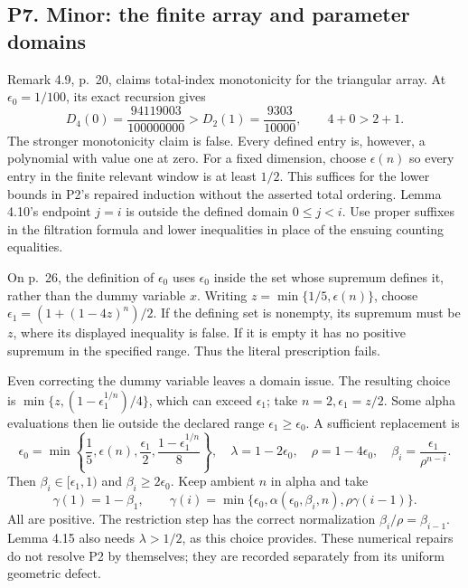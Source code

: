 \documentclass[10pt]{article}
\begin{document}
\subsection*{P7. Minor: the finite array and parameter domains}
Remark 4.9, p. 20, claims total-index monotonicity for the triangular array. At \(\epsilon_0=1/100\), its exact recursion gives \[D_4(0)=\frac{94119003}{100000000}
       >D_2(1)=\frac{9303}{10000},
 \qquad 4+0>2+1.\] The stronger monotonicity claim is false. Every defined entry is, however, a polynomial with value one at zero. For a fixed dimension, choose \(\epsilon(n)\) so every entry in the finite relevant window is at least \(1/2\). This suffices for the lower bounds in P2’s repaired induction without the asserted total ordering. Lemma 4.10’s endpoint \(j=i\) is outside the defined domain \(0\le j<i\). Use proper suffixes in the filtration formula and lower inequalities in place of the ensuing counting equalities.\par
On p. 26, the definition of \(\epsilon_0\) uses \(\epsilon_0\) inside the set whose supremum defines it, rather than the dummy variable \(x\). Writing \(z=\min\{1/5,\epsilon(n)\}\), choose \(\epsilon_1=(1+(1-4z)^n)/2\). If the defining set is nonempty, its supremum must be \(z\), where its displayed inequality is false. If it is empty it has no positive supremum in the specified range. Thus the literal prescription fails.\par
Even correcting the dummy variable leaves a domain issue. The resulting choice is \(\min\{z,(1-\epsilon_1^{1/n})/4\}\), which can exceed \(\epsilon_1\); take \(n=2,\epsilon_1=z/2\). Some alpha evaluations then lie outside the declared range \(\epsilon_1\ge\epsilon_0\). A sufficient replacement is \[\epsilon_0=\min\left\{\frac15,\epsilon(n),\frac{\epsilon_1}{2},
                      \frac{1-\epsilon_1^{1/n}}8\right\},
 \quad \lambda=1-2\epsilon_0,\quad \rho=1-4\epsilon_0,
 \quad \beta_i=\frac{\epsilon_1}{\rho^{n-i}}.\] Then \(\beta_i\in[\epsilon_1,1)\) and \(\beta_i\ge2\epsilon_0\). Keep ambient \(n\) in alpha and take \[\gamma(1)=1-\beta_1,\qquad
 \gamma(i)=\min\{\epsilon_0,\alpha(\epsilon_0,\beta_i,n),
                         \rho\gamma(i-1)\}.\] All are positive. The restriction step has the correct normalization \(\beta_i/\rho=\beta_{i-1}\). Lemma 4.15 also needs \(\lambda>1/2\), as this choice provides. These numerical repairs do not resolve P2 by themselves; they are recorded separately from its uniform geometric defect.\par
\end{document}
